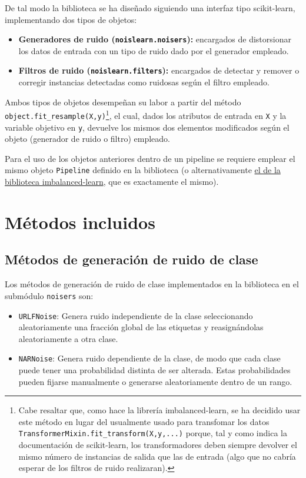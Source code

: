 \documentclass[print, color]{ugrTFG}
\begin{document}
 De tal modo la biblioteca se ha diseñado siguiendo una interfaz tipo scikit-learn, implementando dos tipos de objetos:
 \begin{itemize}
     
     \item \textbf{Generadores de ruido (\texttt{noislearn.noisers}):} encargados de distorsionar los datos de entrada con un tipo de ruido dado por el generador empleado.
     
     \item \textbf{Filtros de ruido (\texttt{noislearn.filters}):} encargados de detectar y remover o corregir instancias detectadas como ruidosas según el filtro empleado.
     
 \end{itemize}

 Ambos tipos de objetos desempeñan su labor a partir del método \texttt{object.fit\_resample(X,y)}\footnote{Cabe resaltar que, como hace la librería imbalanced-learn, se ha decidido usar este método en lugar del usualmente usado para transfomar los datos \texttt{TransformerMixin.fit\_transform(X,y,...)} porque, tal y como indica la documentación de scikit-learn, los transformadores deben siempre devolver el mismo número de instancias de salida que las de entrada (algo que no cabría esperar de los filtros de ruido realizaran).}, el cual, dados los atributos de entrada en \texttt{X} y la variable objetivo en \texttt{y}, devuelve los mismos dos elementos modificados según el objeto (generador de ruido o filtro) empleado.

 Para el uso de los objetos anteriores dentro de un pipeline se requiere emplear el mismo objeto \texttt{Pipeline} definido en la biblioteca (o alternativamente \href{https://imbalanced-learn.org/stable/references/generated/imblearn.pipeline.Pipeline.html}{el de la biblioteca imbalanced-learn}, que es exactamente el mismo).

 

\section{Métodos incluidos}

 \subsection{Métodos de generación de ruido de clase}
 Los métodos de generación de ruido de clase implementados en la biblioteca en el submódulo \texttt{noisers} son:
 \begin{itemize}
    \item \texttt{URLFNoise}: Genera ruido independiente de la clase seleccionando aleatoriamente una fracción global de las etiquetas y reasignándolas aleatoriamente a otra clase.
    \item \texttt{NARNoise}: Genera ruido dependiente de la clase, de modo que cada clase puede tener una probabilidad distinta de ser alterada. Estas probabilidades pueden fijarse manualmente o generarse aleatoriamente dentro de un rango.
 \end{itemize}
 
\end{document}
